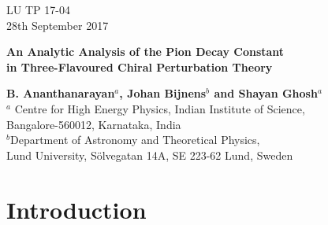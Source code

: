 \documentclass[12pt,a4paper]{article}
\begin{document}
\begin{titlepage}
\begin{flushright}
LU TP 17-04\\
28th September 2017
\end{flushright}
\vfill
\begin{center}
{\Large\bf An Analytic Analysis of the Pion Decay Constant\\[3mm]in Three-Flavoured Chiral Perturbation Theory}

\vfill
{\bf B. Ananthanarayan$^a$, Johan Bijnens$^b$ and Shayan Ghosh$^a$}\\[1cm]
{$^a$ Centre for High Energy Physics, Indian Institute of Science,\\Bangalore-560012, Karnataka, India}\\[0.5cm]
{$^b$Department of Astronomy and Theoretical Physics,\\Lund University,
S\"olvegatan 14A, SE 223-62 Lund, Sweden}
\end{center}
\vfill

\begin{abstract}
A representation of the two-loop contribution to the pion decay constant in $SU(3)$ chiral perturbation theory is presented. The result is analytic upto the contribution of the three (different) mass sunset integrals, for which an expansion in their external momentum has been taken. We also give an analytic expression for the two-loop contribution to the pion mass based on a renormalized representation and in terms of the physical eta mass. We find an expansion of $F_{\pi}$ and $M_{\pi}^2$ in the strange quark mass in the isospin limit, and perform the matching of the chiral SU(2) and SU(3) low energy constants. A numerical analysis demonstrates the high accuracy of our representation, and the strong dependence of the pion decay constant upon the values of the low energy constants, especially in the chiral limit. Finally, we present a simplified representation that is particularly suitable for fitting with available lattice data.
\end{abstract}
\vfill
\vfill
\end{titlepage}


\section{Introduction}
\end{document}
